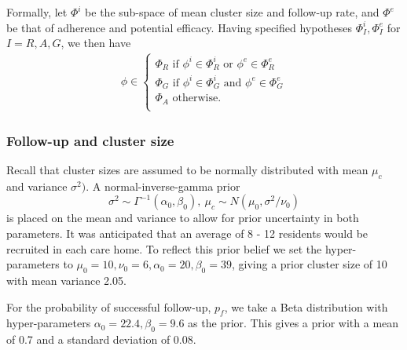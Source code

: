 \documentclass[AMA,STIX1COL]{WileyNJD-v2}
\begin{document}
Formally, let $\Phi^i$ be the sub-space of mean cluster size and follow-up rate, and $\Phi^e$ be that of adherence and potential efficacy. Having specified hypotheses $\Phi^i_I, \Phi^e_I$ for $I = R,A,G$, we then have 
\begin{align}\label{eqn:comb_hyp}
\phi \in \begin{cases}
               \Phi_R \text{ if }  \phi^i \in \Phi^i_R \text{ or } \phi^e \in \Phi^e_R \\
               \Phi_G \text{ if }  \phi^i \in \Phi^i_G \text{ and } \phi^e \in \Phi^e_G \\
               \Phi_A \text{ otherwise}. \\
            \end{cases}
\end{align}

\subsubsection{Follow-up and cluster size}

Recall that cluster sizes are assumed to be normally distributed with mean $\mu_c$ and variance $\sigma^2)$. A normal-inverse-gamma prior 
\begin{equation}
\sigma^{2} \sim \Gamma^{-1} (\alpha_{0}, \beta_{0}), ~ \mu_{c} \sim N(\mu_{0}, \sigma^{2}/\nu_{0})
\end{equation}
is placed on the mean and variance to allow for prior uncertainty in both parameters. It was anticipated that an average of 8 - 12 residents would be recruited in each care home. To reflect this prior belief we set the hyper-parameters to $\mu_{0} = 10, \nu_{0} = 6, \alpha_{0} = 20, \beta_{0} = 39$, giving a prior cluster size of 10 with mean variance 2.05.

For the probability of successful follow-up, $p_f$, we take a Beta distribution with hyper-parameters $\alpha_{0} = 22.4, \beta_{0} = 9.6$ as the prior. This gives a prior with a mean of 0.7 and a standard deviation of 0.08.
\end{document}
